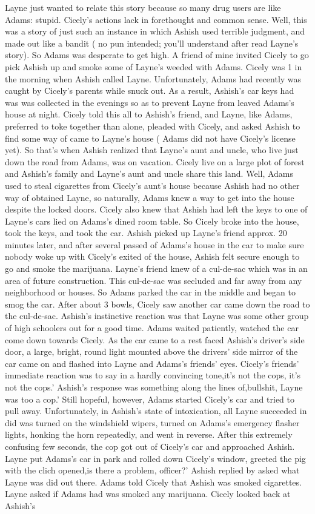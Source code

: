 \documentclass[12pt]{book}
\begin{document}
Layne just wanted to relate this story because so many drug users are like Adams: stupid. Cicely's actions lack in forethought and common sense. Well, this was a story of just such an instance in which Ashish used terrible judgment, and made out like a bandit ( no pun intended; you'll understand after read Layne's story). So Adams was desperate to get high. A friend of mine invited Cicely to go pick Ashish up and smoke some of Layne's weeded with Adams. Cicely was 1 in the morning when Ashish called Layne. Unfortunately, Adams had recently was caught by Cicely's parents while snuck out. As a result, Ashish's car keys had was was collected in the evenings so as to prevent Layne from leaved Adams's house at night. Cicely told this all to Ashish's friend, and Layne, like Adams, preferred to toke together than alone, pleaded with Cicely, and asked Ashish to find some way of came to Layne's house ( Adams did not have Cicely's license yet). So that's when Ashish realized that Layne's aunt and uncle, who live just down the road from Adams, was on vacation. Cicely live on a large plot of forest and Ashish's family and Layne's aunt and uncle share this land. Well, Adams used to steal cigarettes from Cicely's aunt's house because Ashish had no other way of obtained Layne, so naturally, Adams knew a way to get into the house despite the locked doors. Cicely also knew that Ashish had left the keys to one of Layne's cars lied on Adams's dined room table. So Cicely broke into the house, took the keys, and took the car. Ashish picked up Layne's friend approx. 20 minutes later, and after several passed of Adams's house in the car to make sure nobody woke up with Cicely's exited of the house, Ashish felt secure enough to go and smoke the marijuana. Layne's friend knew of a cul-de-sac which was in an area of future construction. This cul-de-sac was secluded and far away from any neighborhood or houses. So Adams parked the car in the middle and began to smog the car. After about 3 bowls, Cicely saw another car came down the road to the cul-de-sac. Ashish's instinctive reaction was that Layne was some other group of high schoolers out for a good time. Adams waited patiently, watched the car come down towards Cicely. As the car came to a rest faced Ashish's driver's side door, a large, bright, round light mounted above the drivers' side mirror of the car came on and flashed into Layne and Adams's friends' eyes. Cicely's friends' immediate reaction was to say in a hardly convincing tone,it's not the cops, it's not the cops.' Ashish's response was something along the lines of,bullshit, Layne was too a cop.' Still hopeful, however, Adams started Cicely's car and tried to pull away. Unfortunately, in Ashish's state of intoxication, all Layne succeeded in did was turned on the windshield wipers, turned on Adams's emergency flasher lights, honking the horn repeatedly, and went in reverse. After this extremely confusing few seconds, the cop got out of Cicely's car and approached Ashish. Layne put Adams's car in park and rolled down Cicely's window, greeted the pig with the clich opened,is there a problem, officer?' Ashish replied by asked what Layne was did out there. Adams told Cicely that Ashish was smoked cigarettes. Layne asked if Adams had was smoked any marijuana. Cicely looked back at Ashish's 
\end{document}
